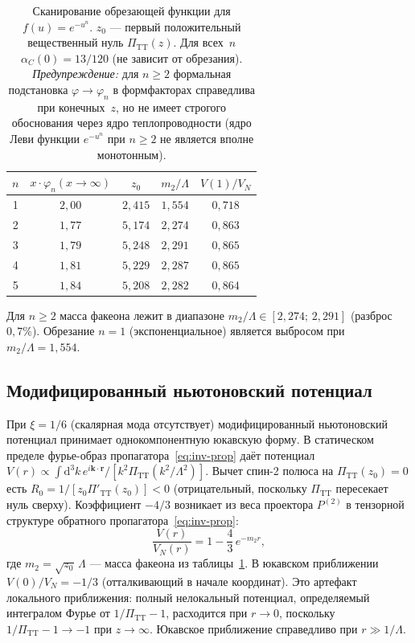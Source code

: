 \documentclass[12pt,a4paper]{article}
\theoremstyle{plain}
\theoremstyle{definition}
\theoremstyle{remark}
\newcommand{\dd}{\mathrm{d}}
\begin{document}
\begin{table}[ht]
\centering
\caption{Сканирование обрезающей функции для $f(u) = e^{-u^n}$.
$z_0$ --- первый положительный вещественный нуль
$\Pi_{\mathrm{TT}}(z)$. Для всех~$n$
$\alpha_C(0) = 13/120$ (не зависит от обрезания).
\emph{Предупреждение:} для $n \geq 2$ формальная подстановка
$\varphi \to \varphi_n$ в формфакторах справедлива при конечных~$z$,
но не имеет строгого обоснования через ядро теплопроводности
(ядро Леви функции $e^{-u^n}$ при $n \geq 2$ не является
вполне монотонным).}
\label{tab:bands}
\begin{tabular}{ccccc}
\toprule
$n$ & $x \cdot \varphi_n(x \to \infty)$
& $z_0$ & $m_2/\Lambda$ & $V(1)/V_N$ \\
\midrule
1 & $2{,}00$ & $2{,}415$ & $1{,}554$ & $0{,}718$ \\
2 & $1{,}77$ & $5{,}174$ & $2{,}274$ & $0{,}863$ \\
3 & $1{,}79$ & $5{,}248$ & $2{,}291$ & $0{,}865$ \\
4 & $1{,}81$ & $5{,}229$ & $2{,}287$ & $0{,}865$ \\
5 & $1{,}84$ & $5{,}208$ & $2{,}282$ & $0{,}864$ \\
\bottomrule
\end{tabular}
\end{table}

Для $n \geq 2$ масса факеона лежит в диапазоне
$m_2/\Lambda \in [2{,}274;\, 2{,}291]$ (разброс~$0{,}7\%$).
Обрезание $n = 1$ (экспоненциальное) является выбросом при
$m_2/\Lambda = 1{,}554$.

\subsection{Модифицированный ньютоновский потенциал}
\label{sec:potential}

При $\xi = 1/6$ (скалярная мода отсутствует) модифицированный
ньютоновский потенциал принимает однокомпонентную юкавскую форму.
В статическом пределе фурье-образ пропагатора~\eqref{eq:inv-prop}
даёт потенциал
$V(r) \propto \int \dd^3 k\, e^{i\mathbf{k}\cdot\mathbf{r}} / [k^2
\Pi_{\mathrm{TT}}(k^2/\Lambda^2)]$.
Вычет спин-2 полюса на $\Pi_{\mathrm{TT}}(z_0) = 0$ есть
$R_0 = 1/[z_0 \Pi'_{\mathrm{TT}}(z_0)] < 0$ (отрицательный, поскольку
$\Pi_{\mathrm{TT}}$ пересекает нуль сверху). Коэффициент $-4/3$
возникает из веса проектора $P^{(2)}$ в тензорной структуре
обратного пропагатора~\eqref{eq:inv-prop}:
\begin{equation}\label{eq:potential}
  \frac{V(r)}{V_N(r)} = 1 - \frac{4}{3}\,e^{-m_2 r},
\end{equation}
где $m_2 = \sqrt{z_0}\,\Lambda$ --- масса факеона из таблицы~\ref{tab:bands}.
В юкавском приближении $V(0)/V_N = -1/3$
(отталкивающий в начале координат). Это артефакт локального
приближения: полный нелокальный потенциал, определяемый интегралом
Фурье от $1/\Pi_{\mathrm{TT}} - 1$, расходится при $r \to 0$,
поскольку $1/\Pi_{\mathrm{TT}} - 1 \to -1$ при $z \to \infty$.
Юкавское приближение справедливо при $r \gg 1/\Lambda$.
\end{document}
